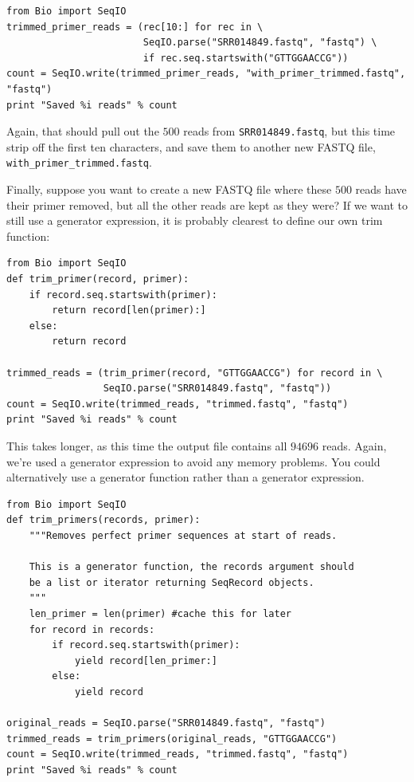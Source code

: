 \documentclass{report}
\begin{document}
\begin{verbatim}
from Bio import SeqIO
trimmed_primer_reads = (rec[10:] for rec in \
                        SeqIO.parse("SRR014849.fastq", "fastq") \
                        if rec.seq.startswith("GTTGGAACCG"))
count = SeqIO.write(trimmed_primer_reads, "with_primer_trimmed.fastq", "fastq")
print "Saved %i reads" % count
\end{verbatim}

\noindent Again, that should pull out the $500$ reads from \texttt{SRR014849.fastq},
but this time strip off the first ten characters, and save them to another new
FASTQ file, \texttt{with\_primer\_trimmed.fastq}.

Finally, suppose you want to create a new FASTQ file where these $500$ reads have
their primer removed, but all the other reads are kept as they were?
If we want to still use a generator expression, it is probably clearest to
define our own trim function:

\begin{verbatim}
from Bio import SeqIO
def trim_primer(record, primer):
    if record.seq.startswith(primer):
        return record[len(primer):]
    else:
        return record

trimmed_reads = (trim_primer(record, "GTTGGAACCG") for record in \
                 SeqIO.parse("SRR014849.fastq", "fastq"))
count = SeqIO.write(trimmed_reads, "trimmed.fastq", "fastq")
print "Saved %i reads" % count
\end{verbatim}

This takes longer, as this time the output file contains all $94696$ reads.
Again, we're used a generator expression to avoid any memory problems.
You could alternatively use a generator function rather than a generator
expression.

\begin{verbatim}
from Bio import SeqIO
def trim_primers(records, primer):
    """Removes perfect primer sequences at start of reads.
    
    This is a generator function, the records argument should
    be a list or iterator returning SeqRecord objects.
    """
    len_primer = len(primer) #cache this for later
    for record in records:
        if record.seq.startswith(primer):
            yield record[len_primer:]
        else:
            yield record

original_reads = SeqIO.parse("SRR014849.fastq", "fastq")
trimmed_reads = trim_primers(original_reads, "GTTGGAACCG")
count = SeqIO.write(trimmed_reads, "trimmed.fastq", "fastq") 
print "Saved %i reads" % count
\end{verbatim}
\end{document}
